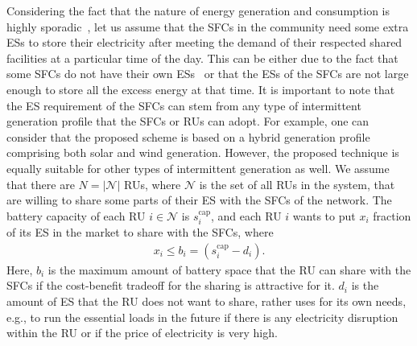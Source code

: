 \documentclass[journal,10pt]{IEEEtran}
\begin{document}
Considering the fact that the nature of energy generation and consumption is highly sporadic~\cite{Saad-CSmartgridComm:2011}, let us assume that the SFCs in the community need some extra ESs to store their electricity after meeting the demand of their respected shared facilities at a particular time of the day. This can be either due to the fact that some SFCs do not have their own ESs~\cite{Tushar-TIE:2014} or that the ESs of the SFCs are not large enough to store all the excess energy at that time. It is important to note that the ES requirement of the SFCs can stem from any type of intermittent generation profile that the SFCs or RUs can adopt. For example, one can consider that the proposed scheme is based on a hybrid generation profile comprising both solar and wind generation. However, the proposed technique is equally suitable for other types of intermittent generation as well. We assume that there are $N = |\mathcal{N}|$ RUs, where $\mathcal{N}$ is the set of all RUs in the system, that are willing to share some parts of their ES with the SFCs of the network. The battery capacity of each RU $i\in\mathcal{N}$ is $s_i^\text{cap}$, and each RU $i$ wants to put $x_i$ fraction of its ES in the market to share with the SFCs, where
\begin{eqnarray}
x_i\leq b_i = \left(s_i^\text{cap}-d_i\right).\label{eqn:1}
\end{eqnarray}
Here, $b_i$ is the maximum amount of battery space that the RU can share with the SFCs if the cost-benefit tradeoff for the sharing is attractive for it. $d_i$ is the amount of ES that the RU does not want to share, rather uses for its own needs, e.g., to run the essential loads in the future if there is any electricity disruption within the RU or if the price of electricity is very high.
\end{document}
